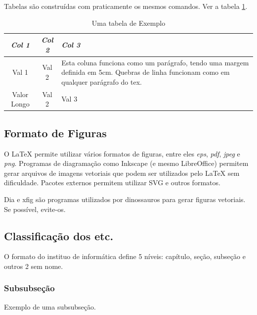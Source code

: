 \documentclass[cic,tc]{iiufrgs}
\begin{document}
Tabelas são construídas com praticamente os mesmos comandos. Ver a tabela \ref{tbl:ex1}.

\begin{table}[h]
    \caption{Uma tabela de Exemplo}
    \centering
        \begin{tabular}{c|c|p{5cm}}
          \hline
          \textit{Col 1}  &   \textit{Col 2}  &   \textit{Col 3} \\
          \hline
          \hline
          Val 1           &   Val 2           & Esta coluna funciona como um parágrafo, tendo uma margem definida em 5cm. Quebras de linha funcionam como em qualquer parágrafo do tex. \\
          Valor Longo     & Val 2             & Val 3 \\
          \hline
        \end{tabular}
    \label{tbl:ex1}
\end{table}

\subsection{Formato de Figuras}
\label{sec:fig_format}

O LaTeX permite utilizar vários formatos de figuras, entre eles \emph{eps}, \emph{pdf}, \emph{jpeg} e \emph{png}. Programas de diagramação como Inkscape (e mesmo LibreOffice) permitem gerar arquivos de imagens vetoriais que podem ser utilizados pelo LaTeX sem dificuldade. Pacotes externos permitem utilizar SVG e outros formatos.

Dia e xfig são programas utilizados por dinossauros para gerar figuras vetoriais. Se possível, evite-os.

\subsection{Classificação dos etc.}

O formato do instituo de informática define 5 níveis: capítulo, seção, subseção e outros 2 sem nome.

\subsubsection{Subsubseção}
Exemplo de uma subsubseção.
\end{document}

